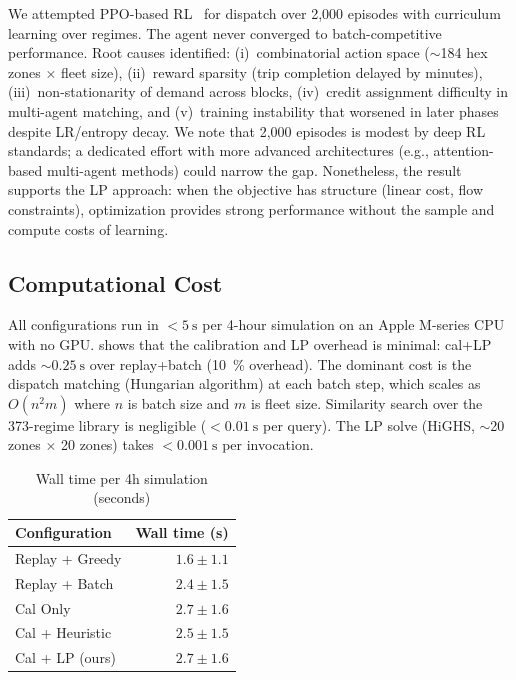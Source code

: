 \documentclass[conference,10pt]{IEEEtran}
\begin{document}
We attempted PPO-based RL~\cite{schulman2017ppo} for dispatch over 2,000 episodes with
curriculum learning over regimes. The agent never converged to
batch-competitive performance. Root causes identified:
(i)~combinatorial action space ($\sim$184 hex zones $\times$ fleet size),
(ii)~reward sparsity (trip completion delayed by minutes),
(iii)~non-stationarity of demand across blocks,
(iv)~credit assignment difficulty in multi-agent matching, and
(v)~training instability that worsened in later phases despite
LR/entropy decay. We note that 2,000 episodes is modest by deep RL
standards; a dedicated effort with more advanced architectures
(e.g., attention-based multi-agent methods) could narrow the gap.
Nonetheless, the result supports the LP approach: when the objective
has structure (linear cost, flow constraints), optimization provides
strong performance without the sample and compute costs of learning.

\subsection{Computational Cost}

All configurations run in $<\SI{5}{\second}$ per 4-hour simulation on an
Apple M-series CPU with no GPU.  shows that the
calibration and LP overhead is minimal: cal+LP adds $\sim\SI{0.25}{\second}$
over replay+batch (\SI{10}{\percent} overhead). The dominant cost is
the dispatch matching (Hungarian algorithm) at each batch step, which
scales as $O(n^2 m)$ where $n$ is batch size and $m$ is fleet size.
Similarity search over the 373-regime library is negligible
($< \SI{0.01}{\second}$ per query). The LP solve (HiGHS,
$\sim$20 zones $\times$ 20 zones) takes $< \SI{0.001}{\second}$ per
invocation.

\begin{table}[t]
  \centering
  \caption{Wall time per 4h simulation (seconds)}
  \label{tab:compute}
  \begin{tabular}{@{}lr@{}}
    \toprule
    Configuration & Wall time (s) \\
    \midrule
    Replay + Greedy   & $1.6 \pm 1.1$ \\
    Replay + Batch    & $2.4 \pm 1.5$ \\
    Cal Only          & $2.7 \pm 1.6$ \\
    Cal + Heuristic   & $2.5 \pm 1.5$ \\
    Cal + LP (ours)   & $2.7 \pm 1.6$ \\
    \bottomrule
  \end{tabular}
\end{table}
\end{document}
